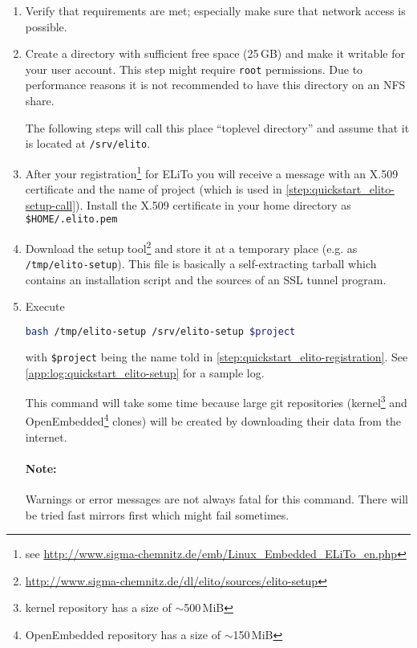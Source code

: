 \begin{enumerate}
\item Verify that requirements are met; especially make sure that
  network access is possible.
\item Create a directory with sufficient free space (25\,GB) and make
  it writable for your user account.  This step might require
  \texttt{root} permissions.  Due to performance reasons it is not
  recommended to have this directory on an NFS share.

  The following steps will call this place ``toplevel directory''
  and assume that it is located at \texttt{/srv/elito}.
\item\label{step:quickstart_elito-registration} After your
  registration\footnote{see
    \url{http://www.sigma-chemnitz.de/emb/Linux_Embedded_ELiTo_en.php}}
  for ELiTo you will receive a message with an X.509 certificate and
  the name of project (which is used in
  \autoref{step:quickstart_elito-setup-call}).  Install the X.509
  certificate in your home directory as \texttt{\$HOME/.elito.pem}
\item Download the setup
  tool\footnote{\url{http://www.sigma-chemnitz.de/dl/elito/sources/elito-setup}}
  and store it at a temporary place (e.g. as
  \texttt{/tmp/elito-setup}).  This file is basically a
  self-extracting tarball which contains an installation script and
  the sources of an SSL tunnel program.
\item\label{step:quickstart_elito-setup-call} Execute
\begin{lstlisting}[language=bash]
bash /tmp/elito-setup /srv/elito-setup $project
\end{lstlisting}
  with \texttt{\$project} being the name told in
  \autoref{step:quickstart_elito-registration}. See
  \autoref{app:log:quickstart_elito-setup} for a sample log.

  This command will take some time because large git repositories
  (kernel\footnote{kernel repository has a size of $\sim$500\,MiB} and
  OpenEmbedded\footnote{OpenEmbedded repository has a size of
    $\sim$150\,MiB} clones) will be created by downloading their data
  from the internet.

  \paragraph{Note:} Warnings or error messages are not always fatal for
  this command.  There will be tried fast mirrors first which might
  fail sometimes.
\end{enumerate}


